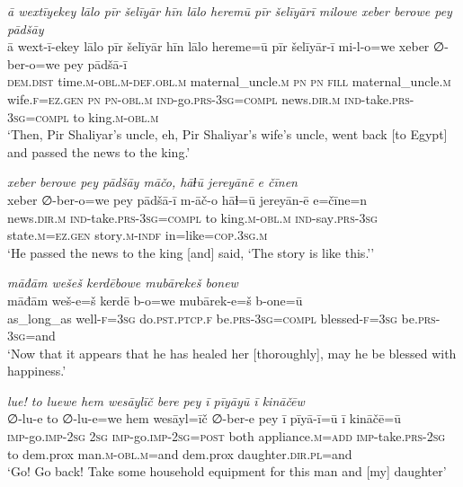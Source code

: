 \ea \label{ŽP.258}
\textit{ā wextīyekey lālo pīr šelīyār hīn lālo heremū pīr šelīyārī milowe xeber berowe pey pādšāy} \\ 
\gll ā wext-ī-ekey lālo pīr šelīyār hīn lālo hereme=ū pīr šelīyār-ī mi-l-o=we xeber ∅-ber-o=we pey pādšā-ī \\ 
 \textsc{dem.dist} time\textsc{.m}\textsc{-obl}\textsc{.m}\textsc{-def}\textsc{.obl}\textsc{.m} maternal\_uncle\textsc{.m} \textsc{pn} \textsc{pn} \textsc{fill} maternal\_uncle\textsc{.m} wife\textsc{.f}\textsc{\textsc{=ez.gen}} \textsc{pn} \textsc{pn}\textsc{-obl}\textsc{.m} \textsc{ind-}go\textsc{.prs}\textsc{-3sg}\textsc{=compl} news\textsc{.dir}\textsc{.m} \textsc{ind-}take\textsc{.prs}\textsc{-3sg}\textsc{=compl} to king\textsc{.m}\textsc{-obl}\textsc{.m} \\ 
\glt `Then, Pir Shaliyar’s uncle, eh, Pir Shaliyar’s wife’s uncle, went back [to Egypt] and passed the news to the king.'
\z 
 
\ea \label{ŽP.259}
\textit{xeber berowe pey pādšāy māčo, hāɫū jereyānē e čīnen} \\ 
\gll xeber ∅-ber-o=we pey pādšā-ī m-āč-o hāɫ=ū jereyān-ē e=čīne=n \\ 
 news\textsc{.dir}\textsc{.m} \textsc{ind-}take\textsc{.prs}\textsc{-3sg}\textsc{=compl} to king\textsc{.m}\textsc{-obl}\textsc{.m} \textsc{ind-}say\textsc{.prs}\textsc{-3sg} state\textsc{.m}\textsc{\textsc{=ez.gen}} story\textsc{.m}\textsc{-indf} in=like\textsc{=cop}\textsc{.3sg}\textsc{.m} \\ 
\glt `He passed the news to the king [and] said, ‘The story is like this.’'
\z 
 
\ea \label{ŽP.261}
\textit{māđām wešeš kerdēbowe mubārekeš bonew} \\ 
\gll māđām weš-e=š kerdē b-o=we mubārek-e=š b-one=ū \\ 
 as\_long\_as well\textsc{-f}\textsc{=3sg} do\textsc{.pst}\textsc{.ptcp}\textsc{.f} be\textsc{.prs}\textsc{-3sg}\textsc{=compl} blessed\textsc{-f}\textsc{=3sg} be\textsc{.prs}\textsc{-3sg}=and \\ 
\glt `Now that it appears that he has healed her [thoroughly], may he be blessed with happiness.'
\z 
 
\ea \label{ŽP.262}
\textit{lue! to luewe hem wesāylīč bere pey ī pīyāyū ī kināčēw} \\ 
\gll ∅-lu-e to ∅-lu-e=we hem wesāyl=īč ∅-ber-e pey ī pīyā-ī=ū ī kināčē=ū \\ 
 \textsc{imp-}go.\textsc{imp-}\textsc{2sg} \textsc{2sg} \textsc{imp-}go.\textsc{imp-}\textsc{2sg}\textsc{=\textsc{post}} both appliance\textsc{.m}\textsc{=add} \textsc{imp-}take\textsc{.prs}-\textsc{2sg} to dem.prox man\textsc{.m}\textsc{-obl}\textsc{.m}=and dem.prox daughter\textsc{.dir}\textsc{.pl}=and \\ 
\glt `Go! Go back! Take some household equipment for this man and [my] daughter'
\z 
 
